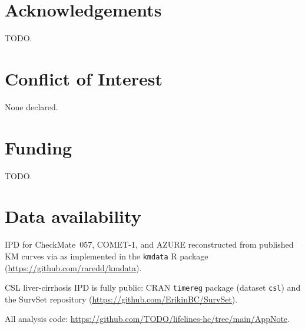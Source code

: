 \documentclass[unnumsec,webpdf,contemporary,large]{oup-authoring-template}
\let\origitemize\itemize
\let\origenditemize\enditemize
\renewenvironment{itemize}{%
  \origitemize
  \setlength{\itemsep}{1pt}%
  \setlength{\parskip}{0pt}%
  \setlength{\topsep}{3pt}%
}{\origenditemize}
\begin{document}

\section*{Acknowledgements}
TODO.

\section*{Conflict of Interest}
None declared.

\section*{Funding}
TODO.

\section*{Data availability}
\begin{itemize}
  \item IPD for CheckMate~057, COMET-1, and AZURE reconstructed from
        published KM curves via \citet{guyot2012} as implemented in the
        \texttt{kmdata} R package (\url{https://github.com/raredd/kmdata}).
  \item CSL liver-cirrhosis IPD is fully public: CRAN \texttt{timereg}
        package (dataset \texttt{csl}) and the SurvSet repository
        \citep{survset2022} (\url{https://github.com/ErikinBC/SurvSet}).
  \item All analysis code:
        \url{https://github.com/TODO/lifelines-hc/tree/main/AppNote}.
\end{itemize}


\end{document}

